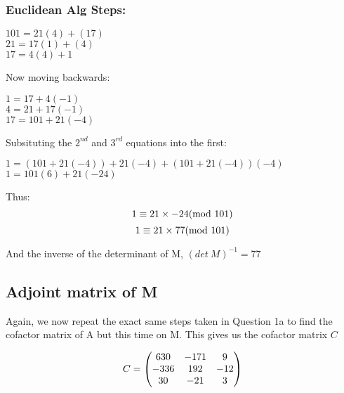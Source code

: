 \documentclass{article}
\numberwithin{equation}{subsection}
\begin{document}
	\subsubsection*{Euclidean Alg Steps:}
	\begin{adjustwidth}{1em}{1em}
			$101 = 21 (4) + (17)$ \\
			$21 = 17(1) + (4)$ \\
			$17 = 4(4) + 1$

			\vspace{10pt}
			\par{
				Now moving backwards:
			}

			$1 = 17 + 4(-1)$ \\
			$4 = 21 + 17(-1)$ \\
			$17 = 101 + 21(-4)$

			\vspace{10pt}
			\par{
				Subsituting the $2^{nd}$ and $3^{rd}$ equations into the first:
			}

			$1 = (101 + 21(-4)) + 21(-4) + (101 + 21(-4)) (-4)$
			$1 = 101(6) + 21(-24)$

			\vspace{10pt}
			\par{
				Thus:
			}
			\begin{equation}\notag
				1 \equiv 21 \times -24 (\textrm{mod} \ 101)
			\end{equation}
			\begin{equation}\notag
				1 \equiv 21 \times 77 (\textrm{mod}\ 101)	
			\end{equation}

			\vspace{10pt}
			\par{
				And the inverse of the determinant of M, $(det\ M)^{-1} = 77$
			}
	\end{adjustwidth}

	\vspace{20pt}
	\subsection*{Adjoint matrix of M}
	\par{
		Again, we now repeat the exact same steps taken in Question 1a to find the cofactor
		matrix of A but this time on M. This gives us the cofactor matrix $C$
	}

	\begin{equation}\notag
		C = \begin{pmatrix}
					630 & -171 & 9 \\
					-336 & 192 & -12 \\
					30 & -21 & 3
				\end{pmatrix}	
	\end{equation}
\end{document}
